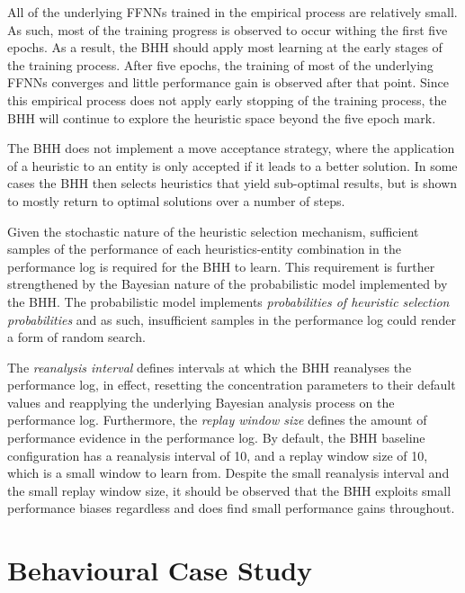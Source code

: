 All of the underlying \acp{FFNN} trained in the empirical process are relatively small. As such, most of the training progress is observed to occur withing the first five epochs. As a result, the \acs{BHH} should apply most learning at the early stages of the training process. After five epochs, the training of most of the underlying \acp{FFNN} converges and little performance gain is observed after that point. Since this empirical process does not apply early stopping of the training process, the \acs{BHH} will continue to explore the heuristic space beyond the five epoch mark.

The \acs{BHH} does not implement a move acceptance strategy, where the application of a heuristic to an entity is only accepted if it leads to a better solution. In some cases the \acs{BHH} then selects heuristics that yield sub-optimal results, but is shown to mostly return to optimal solutions over a number of steps.

Given the stochastic nature of the heuristic selection mechanism, sufficient samples of the performance of each heuristics-entity combination in the performance log is required for the \acs{BHH} to learn. This requirement is further strengthened by the Bayesian nature of the probabilistic model implemented by the \acs{BHH}. The probabilistic model implements \textit{probabilities of heuristic selection probabilities} and as such, insufficient samples in the performance log could render a form of random search.

The \textit{reanalysis interval} defines intervals at which the \acs{BHH} reanalyses the performance log, in effect, resetting the concentration parameters to their default values and reapplying the underlying Bayesian analysis process on the performance log. Furthermore, the \textit{replay window size} defines the amount of performance evidence in the performance log. By default, the \acs{BHH} baseline configuration has a reanalysis interval of 10, and a replay window size of 10, which is a small window to learn from. Despite the small reanalysis interval and the small replay window size, it should be observed that the \acs{BHH} exploits small performance biases regardless and does find small performance gains throughout.

\section{Behavioural Case Study}\label{sec:results:case_study}

